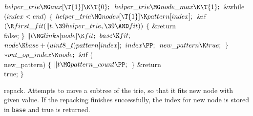 ${}\\{helper\_trie}\MG\\{aux}[\T{1}]\K\T{0};{}$\6
${}\\{helper\_trie}\MG\\{node\_max}\K\T{1};{}$\6
\&{while} ${}(\\{index}<\\{end}){}$\5
${}\{{}$\1\6
${}\\{helper\_trie}\MG\\{nodes}[\T{1}]\K\\{pattern}[\\{index}];{}$\6
\&{if} ${}(\R\\{first\_fit}(\|t,\39\\{helper\_trie},\39{\AND}\\{fit})){}$\5
${}\{{}$\1\6
\&{return} \\{false};\6
\4${}\}{}$\2\6
${}\|t\MG\\{links}[\\{node}]\K\\{fit};{}$\6
${}\\{base}\K\\{fit};{}$\6
${}\\{node}\K\\{base}+(\\{uint8\_t})\\{pattern}[\\{index}];{}$\6
${}\\{index}\PP;{}$\6
${}\\{new\_pattern}\K\\{true};{}$\6
\4${}\}{}$\2\6
${}{*}\\{out\_op\_index}\K\\{node};{}$\6
\&{if} (\\{new\_pattern})\5
${}\{{}$\1\6
${}\|t\MG\\{pattern\_count}\PP;{}$\6
\4${}\}{}$\2\6
\&{return} \\{true};\6
\4${}\}{}$\2\par
\fi

repack.
Attempts to move a subtree of the trie, so that it fits new node with given
value. If the repacking finishes
successfully, the index for new node is stored in {\tt base} and true is
returned.

